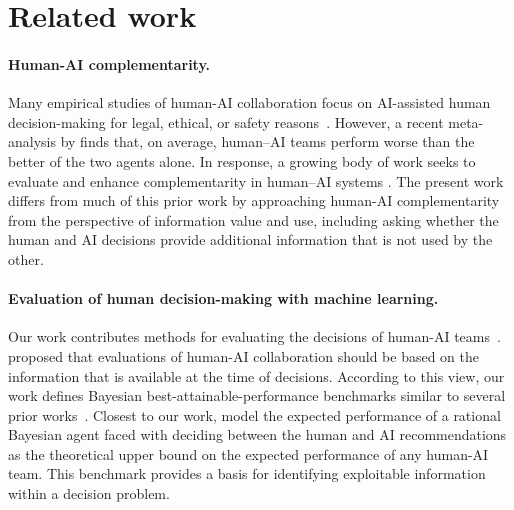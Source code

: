 \section{Related work}
\mvspace{-2mm}
\paragraph{Human-AI complementarity.}

Many empirical studies of human-AI collaboration focus on AI-assisted human decision-making for legal, ethical, or safety reasons~\citep{bo2021toward, boskemper2022measuring, bondi2022role, schemmer2022meta}.
However, a recent meta-analysis by \citet{vaccaro2024combinations} finds that, on average, human–AI teams perform worse than the better of the two agents alone. 
In response, a growing body of work seeks to evaluate and enhance complementarity in human–AI systems \citep{bansal2021does, bansal2019updates, bansal2021most, wilder2021learning, rastogi2023taxonomy, mozannar2024effective}.
The present work differs from much of this prior work by approaching human-AI complementarity from the perspective of information value and use, including asking whether the human and AI decisions provide additional information that is not used by the other.
\mvspace{-2mm}
\paragraph{Evaluation of human decision-making with machine learning.}
Our work contributes methods for evaluating the decisions of human-AI teams~\citep{kleinberg2015prediction, kleinberg2018human, lakkaraju2017selective, mullainathan2022diagnosing,  rambachan2024identifying, guo2024decision, ben2024does, shreekumar2025x}.
\citet{kleinberg2015prediction} proposed that evaluations of human-AI collaboration should be based on the information that is available at the time of decisions.
According to this view, our work defines Bayesian best-attainable-performance benchmarks similar to several prior works~\citep{guo2024decision, wu2023rational,agrawal2020scaling, fudenberg2022measuring}. 
Closest to our work, \citet{guo2024decision} model the expected performance of a rational Bayesian agent faced with deciding between the human and AI recommendations as the theoretical upper bound on the expected performance of any human-AI team.
This benchmark provides a basis for identifying exploitable information within a decision problem.

